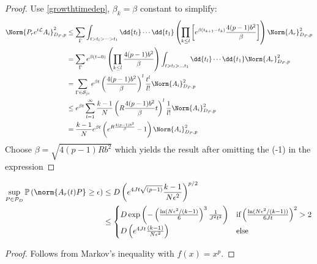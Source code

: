 \begin{proof}
  Use \ref{growthtimedep}, \( \beta_k= \beta \) constant to simplify:
  \begin{align*}
    \Norm{P_r e^{t \mathcal{L}}A_i}_{D_P,p}^{2} & \leq \sum_{\Gamma}^{} \int_{t>t_l > \dots > t_1}^{} \dd{t_l} \cdots \dd{t_1}\left( \prod_{k \leq l} \left[e^{\beta (t_{k+1}-t_k)} \frac{4(p-1) b^{2}}{\beta}\right]\right) \Norm{A_r}_{D_P,p}^{2} \\
                                                & = \sum_{\Gamma }^{} e^{\beta(t-0)} \left(\prod_{k \leq l }^{} \frac{4(p-1) b^{2}}{\beta}\right)  \int_{t> t_l > \dots t_1}^{}  \dd{t_l} \cdots \dd{t_1} \Norm{A_r}_{D_P,p}^{2} \\
                                                &= \sum_{\Gamma \in \mathcal{S}_{ji}}^{} e^{\beta t} \left(\frac{4(p-1)b^{2}}{\beta}\right)^{l} \frac{t^{l}}{l!} \Norm{A_i}_{D_P,p}^{2} \\
                                                &\leq e^{\beta t} \sum_{l=1}^{\infty} \frac{k-1}{N} \left(R \frac{4(p-1) b^{2}}{\beta} t \right)^{l} \frac{1}{l!} \Norm{A_i}_{D_P,p}^{2} \\
                                                &= \frac{k-1}{N} e^{\beta t} \left(e^{R \frac{4(p-1)b^{2}}{\beta}}-1\right)\Norm{A_i}_{D_P,p}^{2} 
  \end{align*}
  Choose \( \beta = \sqrt{4(p-1)Rb^{2}} \) which yields the result after omitting the (-1) in the expression
\end{proof}


\begin{lem}[]
  \begin{align*} 
    \sup_{P \in \mathcal{P}_D}\mathbb{P}\left(\norm{A_r(t)P}_{} \geq \epsilon\right) &\leq D\left(e^{4Jt \sqrt{(p-1)}} \frac{k-1}{N\epsilon^{2}}\right)^{p/2} \\
                                                                                     &\leq 
    \begin{cases}
      D \operatorname{exp}\left(- \left(\frac{\operatorname{ln}(N\epsilon^{2}/ (k-1)}{6}\right)^{3} \frac{1}{J^{2}t^{2}}\right) & \text{if} \left( \frac{\operatorname{ln}(N\epsilon^{2}/(k-1))}{6Jt}\right)^{2} >2 \\
      D\left(e^{4Jt} \frac{(k-1)}{N\epsilon^{2}}\right) & \text{else}
    \end{cases}
  \end{align*}
\end{lem}
\begin{proof}
    Follows from Markov's inequality with \( f(x)=x^{p}  \).
\end{proof}



